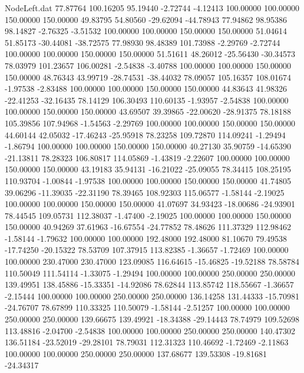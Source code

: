 \begin{filecontents}{NodeLeft.dat}
  77.87764  100.16205   95.19440    -2.72744   -4.12413  100.00000  100.00000  150.00000  150.00000   49.83795   54.80560  -29.62094  -44.78943
  77.94862   98.95386   98.14827    -2.76325   -3.51532  100.00000  100.00000  150.00000  150.00000   51.04614   51.85173  -30.44081  -38.72575
  77.98930   98.48389  101.73988    -2.29769   -2.72744  100.00000  100.00000  150.00000  150.00000   51.51611   48.26012  -25.56430  -30.34573
  78.03979  101.23657  106.00281    -2.54838   -3.40788  100.00000  100.00000  150.00000  150.00000   48.76343   43.99719  -28.74531  -38.44032
  78.09057  105.16357  108.01674    -1.97538   -2.83488  100.00000  100.00000  150.00000  150.00000   44.83643   41.98326  -22.41253  -32.16435
  78.14129  106.30493  110.60135    -1.93957   -2.54838  100.00000  100.00000  150.00000  150.00000   43.69507   39.39865  -22.00620  -28.91375
  78.18188  105.39856  107.94968    -1.54563   -2.29769  100.00000  100.00000  150.00000  150.00000   44.60144   42.05032  -17.46243  -25.95918
  78.23258  109.72870  114.09241    -1.29494   -1.86794  100.00000  100.00000  150.00000  150.00000   40.27130   35.90759  -14.65390  -21.13811
  78.28323  106.80817  114.05869    -1.43819   -2.22607  100.00000  100.00000  150.00000  150.00000   43.19183   35.94131  -16.21022  -25.09055
  78.34415  108.25195  110.93704    -1.00844   -1.97538  100.00000  100.00000  150.00000  150.00000   41.74805   39.06296  -11.39035  -22.31190
  78.39465  108.92303  115.06577    -1.58144   -2.19025  100.00000  100.00000  150.00000  150.00000   41.07697   34.93423  -18.00686  -24.93901
  78.44545  109.05731  112.38037    -1.47400   -2.19025  100.00000  100.00000  150.00000  150.00000   40.94269   37.61963  -16.67554  -24.77852
  78.48626  111.37329  112.98462    -1.58144   -1.79632  100.00000  100.00000  192.48000  192.48000   81.10670   79.49538  -17.74250  -20.15322
  78.53709  107.37915  113.82385    -1.36657   -1.72469  100.00000  100.00000  230.47000  230.47000  123.09085  116.64615  -15.46825  -19.52188
  78.58784  110.50049  111.54114    -1.33075   -1.29494  100.00000  100.00000  250.00000  250.00000  139.49951  138.45886  -15.33351  -14.92086
  78.62844  113.85742  118.55667    -1.36657   -2.15444  100.00000  100.00000  250.00000  250.00000  136.14258  131.44333  -15.70981  -24.76707
  78.67899  110.33325  110.50079    -1.58144   -2.51257  100.00000  100.00000  250.00000  250.00000  139.66675  139.49921  -18.34388  -29.14443
  78.74979  109.52698  113.48816    -2.04700   -2.54838  100.00000  100.00000  250.00000  250.00000  140.47302  136.51184  -23.52019  -29.28101
  78.79031  112.31323  110.46692    -1.72469   -2.11863  100.00000  100.00000  250.00000  250.00000  137.68677  139.53308  -19.81681  -24.34317

\end{filecontents}

